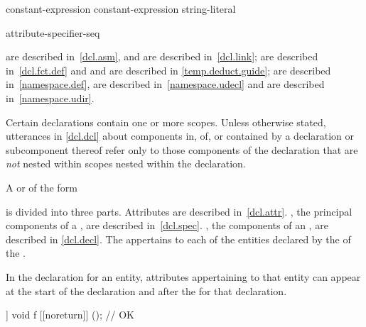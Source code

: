 \begin{bnf}
\br
   \terminal{(} constant-expression \terminal{)} \terminal{;}\br
   \terminal{(} constant-expression \terminal{,} string-literal \terminal{)} \terminal{;}
\end{bnf}

\begin{bnf}
\br
    \terminal{;}
\end{bnf}

\begin{bnf}
\br
    attribute-specifier-seq \terminal{;}
\end{bnf}

\begin{note}
 are described in~\ref{dcl.asm}, and
 are described in~\ref{dcl.link};
 are described in~\ref{dcl.fct.def} and
 and
 are described in \ref{temp.deduct.guide};
 are described in~\ref{namespace.def},
 are described in~\ref{namespace.udecl} and
 are described in~\ref{namespace.udir}.
\end{note}

\pnum
{}%
%
Certain declarations contain one or more scopes.
Unless otherwise stated, utterances in
\ref{dcl.dcl} about components in, of, or contained by a
declaration or subcomponent thereof refer only to those components of
the declaration that are \emph{not} nested within scopes nested within
the declaration.

\pnum
A
 or
 of the form
\begin{ncsimplebnf}
   \terminal{;}
\end{ncsimplebnf}
is divided into three parts.
Attributes are described in~\ref{dcl.attr}.
, the principal components of
a , are described in~\ref{dcl.spec}.
, the components of an
, are described in \ref{dcl.decl}.
The 
appertains to each of the entities declared by
the 
of the .
\begin{note}
In the declaration for an entity, attributes appertaining to that
entity can appear at the start of the declaration and after the
 for that declaration.
\end{note}
\begin{example}
\begin{codeblock}
[[noreturn]] void f [[noreturn]] ();    // OK
\end{codeblock}
\end{example}

